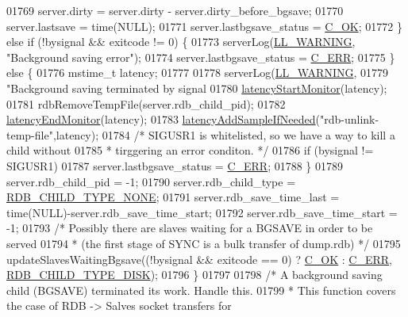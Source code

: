 \begin{DoxyCode}
{{{{{{{{{{{{{{{{{{{{{{{{{{{{{{{{{{01769         server.dirty = server.dirty - server.dirty\_before\_bgsave;
01770         server.lastsave = time(NULL);
01771         server.lastbgsave\_status = \hyperlink{server_8h_a303769ef1065076e68731584e758d3e1}{C\_OK};
01772     \} \textcolor{keywordflow}{else} \textcolor{keywordflow}{if} (!bysignal && exitcode != 0) \{
01773         serverLog(\hyperlink{server_8h_a31229b9334bba7d6be2a72970967a14b}{LL\_WARNING}, \textcolor{stringliteral}{"Background saving error"});
01774         server.lastbgsave\_status = \hyperlink{server_8h_af98ac28d5f4d23d7ed5985188e6fb7d1}{C\_ERR};
01775     \} \textcolor{keywordflow}{else} \{
01776         mstime\_t latency;
01777 
01778         serverLog(\hyperlink{server_8h_a31229b9334bba7d6be2a72970967a14b}{LL\_WARNING},
01779             \textcolor{stringliteral}{"Background saving terminated by signal %
01780         \hyperlink{latency_8h_a87d7b5b368dad97457f13466d760b0e1}{latencyStartMonitor}(latency);
01781         rdbRemoveTempFile(server.rdb\_child\_pid);
01782         \hyperlink{latency_8h_a88461aee20da0a648fe3332b5f068df7}{latencyEndMonitor}(latency);
01783         \hyperlink{latency_8h_a77922ab34035890c90f98831a9071359}{latencyAddSampleIfNeeded}(\textcolor{stringliteral}{"rdb-unlink-temp-file"},latency);
01784         \textcolor{comment}{/* SIGUSR1 is whitelisted, so we have a way to kill a child without}
01785 \textcolor{comment}{         * tirggering an error conditon. */}
01786         \textcolor{keywordflow}{if} (bysignal != SIGUSR1)
01787             server.lastbgsave\_status = \hyperlink{server_8h_af98ac28d5f4d23d7ed5985188e6fb7d1}{C\_ERR};
01788     \}
01789     server.rdb\_child\_pid = -1;
01790     server.rdb\_child\_type = \hyperlink{server_8h_acfd6e0670ac08e8f4c13f33c8a2c6b5e}{RDB\_CHILD\_TYPE\_NONE};
01791     server.rdb\_save\_time\_last = time(NULL)-server.rdb\_save\_time\_start;
01792     server.rdb\_save\_time\_start = -1;
01793     \textcolor{comment}{/* Possibly there are slaves waiting for a BGSAVE in order to be served}
01794 \textcolor{comment}{     * (the first stage of SYNC is a bulk transfer of dump.rdb) */}
01795     updateSlavesWaitingBgsave((!bysignal && exitcode == 0) ? \hyperlink{server_8h_a303769ef1065076e68731584e758d3e1}{C\_OK} : 
      \hyperlink{server_8h_af98ac28d5f4d23d7ed5985188e6fb7d1}{C\_ERR}, \hyperlink{server_8h_a9d886e992717fa246dd7954244ff6bdf}{RDB\_CHILD\_TYPE\_DISK});
01796 \}
01797 
01798 \textcolor{comment}{/* A background saving child (BGSAVE) terminated its work. Handle this.}
01799 \textcolor{comment}{ * This function covers the case of RDB -> Salves socket transfers for}
}}}}}}}}}}}}}}}}}}}}}}}}}}}}}}}}}}}
\end{DoxyCode}
